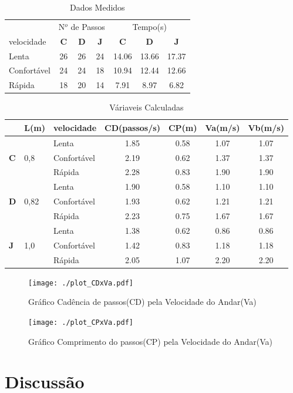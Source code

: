 \documentclass[a4paper,10pt]{article}
\begin{document}
\begin{table}
\label{tab_medidas}
\begin{center}
\begin{tabular}{l|ccc|ccc}
 & \multicolumn{3}{|c|}{N$^o$ de Passos} & \multicolumn{3}{|c}{Tempo(s)}\\
 velocidade & \textbf{C} & \textbf{D} & \textbf{J} & \textbf{C} & \textbf{D} & \textbf{J}\\
 \hline
Lenta & 26 & 26 & 24 & 14.06 & 13.66 & 17.37\\
Confortável & 24 & 24 & 18 & 10.94 & 12.44 & 12.66\\
Rápida & 18 & 20 & 14 & 7.91 & 8.97 & 6.82
\end{tabular}
\end{center}
\caption{Dados Medidos}
\end{table}



\begin{table}
\label{tab_calculados}
\begin{center}
\begin{tabular}{ll|lcccc}
&L(m)&velocidade & CD(passos/s) & CP(m) & Va(m/s) & Vb(m/s)\\
\hline
 & &Lenta & 1.85 & 0.58 & 1.07 & 1.07\\
\textbf{C}& 0,8&Confortável & 2.19 & 0.62 & 1.37 & 1.37\\
 & &Rápida & 2.28 & 0.83 & 1.90 & 1.90 \\
\hline
 & &Lenta & 1.90 & 0.58 & 1.10 & 1.10\\
\textbf{D}& 0,82&Confortável & 1.93 & 0.62 & 1.21 & 1.21\\
 & &Rápida & 2.23 & 0.75 & 1.67 & 1.67\\
\hline
 & &Lenta & 1.38 & 0.62 & 0.86 & 0.86\\
\textbf{J}& 1,0&Confortável & 1.42 & 0.83 & 1.18 & 1.18\\
 & &Rápida & 2.05 & 1.07 & 2.20 & 2.20\\
\end{tabular}
\end{center}
\caption{Váriaveis Calculadas}
\end{table}

\begin{figure}[h]
\label{plotCDxVa}
 \centering
 \texttt{[image: ./plot\_CDxVa.pdf]}
 \caption{Gráfico Cadência de passos(CD) pela Velocidade do Andar(Va)}
\end{figure}

\begin{figure}[h]
\label{plotCPxVa}
 \centering
 \texttt{[image: ./plot\_CPxVa.pdf]}
 \caption{Gráfico Comprimento do passos(CP) pela Velocidade do Andar(Va)}
\end{figure}


\section{Discussão}
\end{document}
